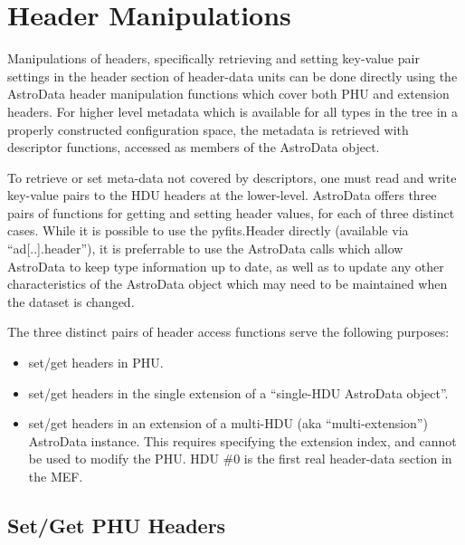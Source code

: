\documentclass[letterpaper,10pt,english]{sphinxmanual}
\begin{document}
\section{Header Manipulations}
\label{chapter_AstroDataClass:header-manipulations}
Manipulations of headers, specifically retrieving and setting key-value
pair settings in the header section of header-data units
can be done directly using the AstroData header manipulation functions
which cover both PHU and extension headers.
For higher level metadata which is available for all types in the tree
in a properly constructed configuration space, the metadata is retrieved with
descriptor functions, accessed as members of the AstroData object.

To retrieve or set meta-data not covered by descriptors, one must
read and write key-value pairs to the HDU headers at the lower-level. AstroData
offers three pairs of functions for getting and setting header values, for each
of three distinct cases.  While it is possible to use the pyfits.Header directly
(available via ``ad{[}..{]}.header''), it is preferrable to use the AstroData calls
which allow AstroData to keep type information up to date, as well as to update
any other characteristics of the AstroData object which may need to be
maintained when the dataset is changed.

The three distinct pairs of header access functions serve the following
purposes:
\begin{itemize}
\item {} 
set/get headers in PHU.

\item {} 
set/get headers in the single extension of a ``single-HDU AstroData
object''.

\item {} 
set/get headers in an extension of a multi-HDU (aka ``multi-extension'')
AstroData instance. This requires specifying the extension index, and
cannot be used to modify the PHU. HDU \#0 is the first real
header-data section in the MEF.

\end{itemize}


\subsection{Set/Get PHU Headers}
\label{chapter_AstroDataClass:set-get-phu-headers}
\end{document}
